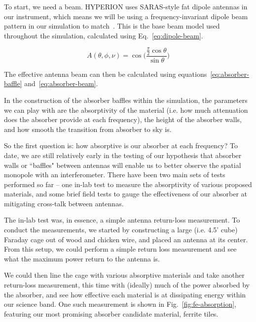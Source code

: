 To start, we need a beam. HYPERION uses SARAS-style fat dipole antennas in our 
instrument, which means we will be using a frequency-invariant dipole beam 
pattern in our simulation to match~\citep{patra2013}. This is the base beam 
model used throughout the simulation, calculated using 
Eq.~\eqref{eq:dipole-beam}.

\begin{equation}
    \label{eq:dipole-beam}
    A(\theta, \phi, \nu) = \cos\Big(\frac{\frac{\pi}{2} 
    \cos{\theta}}{\sin{\theta}}\Big)
\end{equation}

The effective antenna beam can then be calculated using 
equations~\eqref{eq:absorber-baffle} and~\eqref{eq:absorber-beam}.

In the construction of the absorber baffles within the simulation, the 
parameters we can play with are the absorptivity of the material (i.e.  how 
much attenuation does the absorber provide at each frequency), the height of 
the absorber walls, and how smooth the transition from absorber to sky is.  

So the first question is: how absorptive is our absorber at each frequency? To 
date, we are still relatively early in the testing of our hypothesis that 
absorber walls or ``baffles" between antennas will enable us to better observe 
the spatial monopole with an interferometer.  There have been two main sets of 
tests performed so far -- one in-lab test to measure the absorptivity of 
various proposed materials, and some brief field tests to gauge the 
effectiveness of our absorber at mitigating cross-talk between antennas.

The in-lab test was, in essence, a simple antenna return-loss measurement. To 
conduct the measurements, we started by constructing a large (i.e. 4.5' cube) 
Faraday cage out of wood and chicken wire, and placed an antenna at its center.  
From this setup, we could perform a simple return loss measurement and see what 
the maximum power return to the antenna is.

We could then line the cage with various absorptive materials and take another 
return-loss measurement, this time with (ideally) much of the power absorbed by 
the absorber, and see how effective each material is at dissipating energy 
within our science band. One such measurement is shown in 
Fig.~\ref{fig:fe-absorption}, featuring our most promising absorber candidate 
material, ferrite tiles.

